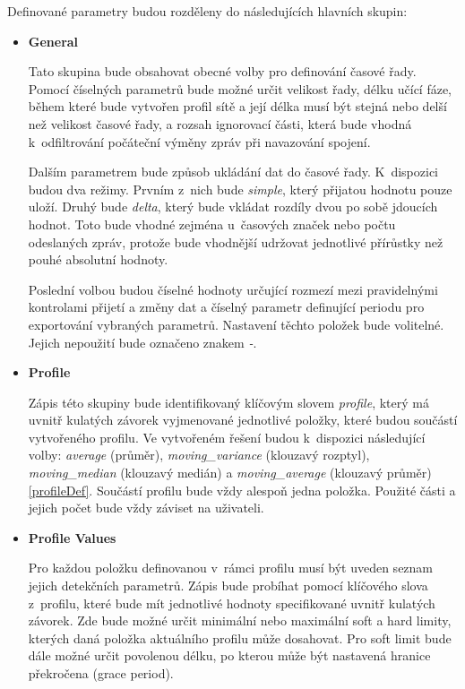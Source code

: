  
 Definované parametry budou rozděleny do následujících hlavních skupin:
 \begin{itemize}
  \item \textbf{General} 
  
  Tato skupina bude obsahovat obecné volby pro definování časové řady. Pomocí číselných parametrů 
  bude možné určit velikost řady, délku učící fáze, během které bude vytvořen profil sítě a její délka
  musí být stejná nebo delší než velikost časové řady, a rozsah ignorovací části, která bude vhodná
  k~odfiltrování počáteční výměny zpráv při navazování spojení. 
  
  Dalším parametrem bude způsob 
  ukládání dat do časové řady. K~dispozici budou dva režimy. Prvním z~nich bude \textit{simple},
  který přijatou
  hodnotu pouze uloží. Druhý bude \textit{delta}, který bude vkládat rozdíly dvou po
  sobě jdoucích hodnot. 
  Toto bude vhodné zejména u~časových značek nebo počtu odeslaných zpráv, protože bude vhodnější 
  udržovat jednotlivé přírůstky než pouhé absolutní hodnoty. 
  
  Poslední volbou budou číselné hodnoty určující rozmezí mezi pravidelnými kontrolami
  přijetí a změny dat a 
  číselný parametr definující periodu pro exportování vybraných parametrů. Nastavení těchto položek
  bude volitelné. Jejich nepoužití bude označeno znakem \textit{-}.
  
  \item \textbf{Profile}
  
  Zápis této skupiny bude identifikovaný klíčovým slovem \textit{profile}, který má uvnitř kulatých závorek 
  vyjmenované jednotlivé položky, které budou součástí vytvořeného profilu. Ve vytvořeném řešení 
  budou k~dispozici následující volby: \textit{average} (průměr), \textit{moving\_variance} (klouzavý rozptyl), 
  \textit{moving\_median} (klouzavý medián) a \textit{moving\_average} (klouzavý průměr) \ref{profileDef}.
  Součástí profilu bude vždy alespoň
  jedna položka. Použité části a jejich počet bude vždy záviset na uživateli.
  
  \item \textbf{Profile Values}
  
  Pro každou položku definovanou v~rámci profilu musí být uveden seznam jejich detekčních parametrů.
  Zápis bude probíhat pomocí klíčového slova z~profilu, které bude mít jednotlivé hodnoty 
  specifikované uvnitř kulatých závorek. Zde bude možné určit minimální nebo maximální soft a hard
  limity, kterých daná položka aktuálního profilu může dosahovat. Pro soft limit bude dále možné 
  určit povolenou délku, po kterou může být nastavená hranice překročena (grace period). 
  

\end{itemize}
